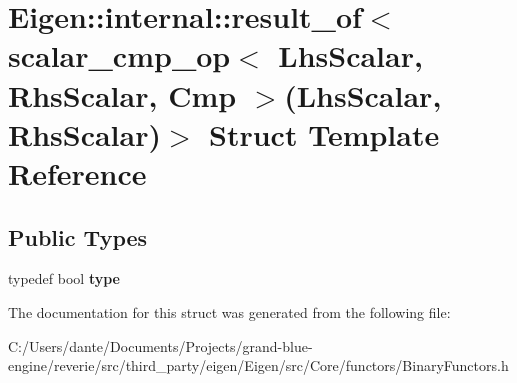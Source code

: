 \hypertarget{struct_eigen_1_1internal_1_1result__of_3_01scalar__cmp__op_3_01_lhs_scalar_00_01_rhs_scalar_00_09c9877449c1099527f34eb0a0f299607}{}\section{Eigen\+::internal\+::result\+\_\+of$<$ scalar\+\_\+cmp\+\_\+op$<$ Lhs\+Scalar, Rhs\+Scalar, Cmp $>$(Lhs\+Scalar, Rhs\+Scalar)$>$ Struct Template Reference}
\label{struct_eigen_1_1internal_1_1result__of_3_01scalar__cmp__op_3_01_lhs_scalar_00_01_rhs_scalar_00_09c9877449c1099527f34eb0a0f299607}
\subsection*{Public Types}
\begin{DoxyCompactItemize}
\item 
\mbox{\label{struct_eigen_1_1internal_1_1result__of_3_01scalar__cmp__op_3_01_lhs_scalar_00_01_rhs_scalar_00_09c9877449c1099527f34eb0a0f299607_ad71776b5f3e55cc1949d292b6c3f9a28}} 
typedef bool {\bfseries type}
\end{DoxyCompactItemize}


The documentation for this struct was generated from the following file\+:\begin{DoxyCompactItemize}
\item 
C\+:/\+Users/dante/\+Documents/\+Projects/grand-\/blue-\/engine/reverie/src/third\+\_\+party/eigen/\+Eigen/src/\+Core/functors/Binary\+Functors.\+h\end{DoxyCompactItemize}
